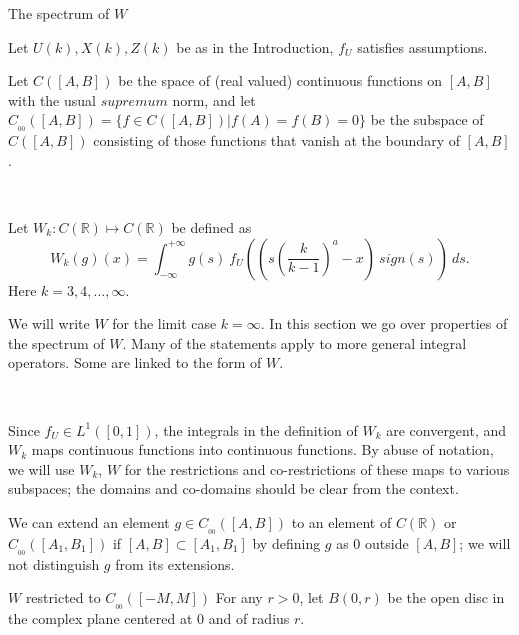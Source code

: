 \documentclass[12pt]{article}
\newenvironment{definition}[1][Definition]{\begin{trivlist}
		\item[\hskip \labelsep {\bfseries #1}]}{\end{trivlist}}
\begin{document}
\begin{section}{The spectrum of $W$ }  
	
	Let $U(k),X(k),Z(k)$ be as in the Introduction, $f_U$ satisfies assumptions.  
	
	\begin{definition} Let $C([A,B])$ be the space of (real valued) continuous functions on $[A,B]$ with the usual $supremum$ norm, and let $C_{_{0\!0}}([A,B]) = \{f \in C([A,B]) | f(A)=f(B) = 0\}$ be the subspace of $C([A,B])$ consisting of those functions that vanish at the boundary of $[A,B]$. 
		
	\  
		
	Let $W_k: C(\mathbb{R}) \longmapsto C(\mathbb{R})$ be defined as
	\begin{equation} \label{eq:Wk}
	W_k(g)(x) = \int_{-\infty}^{+\infty} g(s)\ f_U\!\left(  \left(s \left(\frac{k}{k-1}\right)^a - x \right)\ sign(s) \right) \ ds.
	\end{equation}
	Here $k=3,4,\dots, \infty$.   
	
	We will write $W$ for the limit case $k=\infty$. In this section we go over properties of the spectrum of $W$. Many of the statements apply to more general integral operators. Some are linked to the form of $W$.
	
	\
	
	Since $f_U \in L^1([0,1])$, the integrals in the definition of $W_k$ are convergent, and $W_k$ maps continuous functions into continuous functions. By abuse of notation, we will use $W_k$, $W$ for the restrictions and co-restrictions of these maps to various subspaces; the domains and co-domains should be clear from the context.  
	
	We can extend an element $g \in C_{_{0\!0}}([A,B])$ to an element of $C(\mathbb{R})$ or $C_{_{00}}([A_1,B_1])$ if $[A,B] \subset [A_1,B_1]$ by defining $g$ as $0$ outside $[A,B]$; we will not distinguish $g$ from its extensions.  
	
  
\end{definition}

\begin{subsection}{$W$ restricted to $C_{_{0\!0}}([-M,M])$}
	For any $r > 0$, let $B(0,r)$ be the open disc in the complex plane centered at $0$ and of radius $r$.  
	

\end{subsection}
\end{section}
\end{document}
